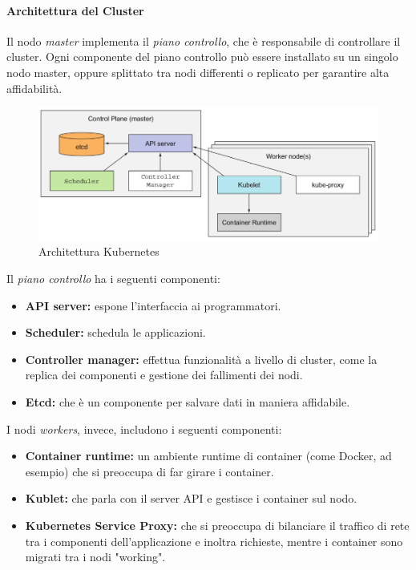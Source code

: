 \documentclass{article}
\begin{document}
\paragraph{Architettura del Cluster}
Il nodo \textit{master} implementa il \textit{piano controllo}, che è responsabile di controllare il cluster. Ogni componente del piano controllo può essere installato su un singolo nodo master, oppure splittato tra nodi differenti o replicato per garantire alta affidabilità. 
\begin{figure}[H]
    \centering
    \includegraphics[scale=0.4]{img/architettura kubernetes.png}
    \caption{Architettura Kubernetes}
\end{figure}\noindent
Il \textit{piano controllo} ha i seguenti componenti:
\begin{itemize}
    \item \textbf{API server:} espone l'interfaccia ai programmatori.
    \item \textbf{Scheduler:} schedula le applicazioni.
    \item \textbf{Controller manager:} effettua funzionalità a livello di cluster, come la replica dei componenti e gestione dei fallimenti dei nodi.
    \item \textbf{Etcd:} che è un componente per salvare dati in maniera affidabile.
\end{itemize}
I nodi \textit{workers}, invece, includono i seguenti componenti:
\begin{itemize}
    \item \textbf{Container runtime:} un ambiente runtime di container (come Docker, ad esempio) che si preoccupa di far girare i container.
    \item \textbf{Kublet:} che parla con il server API e gestisce i container sul nodo.
    \item \textbf{Kubernetes Service Proxy:} che si preoccupa di bilanciare il traffico di rete tra i componenti dell'applicazione e inoltra richieste, mentre i container sono migrati tra i nodi "working".
\end{itemize}
\end{document}
